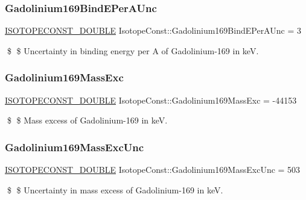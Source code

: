 \subsubsection{\texorpdfstring{Gadolinium169\+Bind\+E\+Per\+A\+Unc}{Gadolinium169BindEPerAUnc}}
{\footnotesize\ttfamily \mbox{\hyperlink{group___isotope_const-_macros_ga8f45a7272ce02c0b4c65c44636ed719a}{I\+S\+O\+T\+O\+P\+E\+C\+O\+N\+S\+T\+\_\+\+D\+O\+U\+B\+LE}} Isotope\+Const\+::\+Gadolinium169\+Bind\+E\+Per\+A\+Unc = 3}

\$ \$ Uncertainty in binding energy per A of Gadolinium-\/169 in keV. \mbox{\label{group___isotope_const-_gadolinium-_gd169_ga07522909e7896eb0c7036152b3eb91a9}} 
\subsubsection{\texorpdfstring{Gadolinium169\+Mass\+Exc}{Gadolinium169MassExc}}
{\footnotesize\ttfamily \mbox{\hyperlink{group___isotope_const-_macros_ga8f45a7272ce02c0b4c65c44636ed719a}{I\+S\+O\+T\+O\+P\+E\+C\+O\+N\+S\+T\+\_\+\+D\+O\+U\+B\+LE}} Isotope\+Const\+::\+Gadolinium169\+Mass\+Exc = -\/44153}

\$ \$ Mass excess of Gadolinium-\/169 in keV. \mbox{\label{group___isotope_const-_gadolinium-_gd169_gaf4e45c13e2884207a91272597e4751c0}} 
\subsubsection{\texorpdfstring{Gadolinium169\+Mass\+Exc\+Unc}{Gadolinium169MassExcUnc}}
{\footnotesize\ttfamily \mbox{\hyperlink{group___isotope_const-_macros_ga8f45a7272ce02c0b4c65c44636ed719a}{I\+S\+O\+T\+O\+P\+E\+C\+O\+N\+S\+T\+\_\+\+D\+O\+U\+B\+LE}} Isotope\+Const\+::\+Gadolinium169\+Mass\+Exc\+Unc = 503}

\$ \$ Uncertainty in mass excess of Gadolinium-\/169 in keV. \mbox{\label{group___isotope_const-_gadolinium-_gd169_ga88bf5a2d833782f02ba38f13ab82e3db}} 
